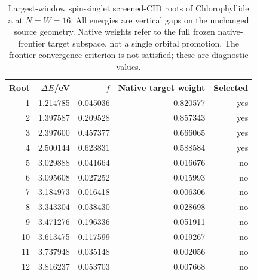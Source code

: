 \begin{table}[!htbp]\centering\small
\caption{Largest-window spin-singlet screened-CID roots of Chlorophyllide a at $N=W=16$. All energies are vertical gaps on the unchanged source geometry. Native weights refer to the full frozen native-frontier target subspace, not a single orbital promotion. The frontier convergence criterion is not satisfied; these are diagnostic values.}
\label{tab:chlorophyllide_cid}
\begin{tabular}{rrrrr}\toprule
Root & $\Delta E$/eV & $f$ & Native target weight & Selected\\\midrule
1 & 1.214785 & 0.045036 & 0.820577 & yes\\
2 & 1.397587 & 0.209528 & 0.857343 & yes\\
3 & 2.397600 & 0.457377 & 0.666065 & yes\\
4 & 2.500144 & 0.623831 & 0.588584 & yes\\
5 & 3.029888 & 0.041664 & 0.016676 & no\\
6 & 3.095608 & 0.027252 & 0.015993 & no\\
7 & 3.184973 & 0.016418 & 0.006306 & no\\
8 & 3.343304 & 0.038430 & 0.028698 & no\\
9 & 3.471276 & 0.196336 & 0.051911 & no\\
10 & 3.613475 & 0.117599 & 0.019267 & no\\
11 & 3.737948 & 0.035148 & 0.002056 & no\\
12 & 3.816237 & 0.053703 & 0.007668 & no\\
\bottomrule\end{tabular}
\end{table}
